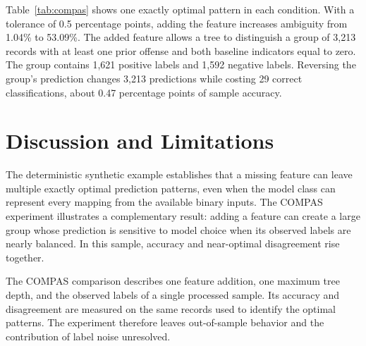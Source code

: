\documentclass{article}
\begin{document}
Table~\ref{tab:compas} shows one exactly optimal pattern in each condition. With a tolerance of 0.5 percentage points, adding the feature increases ambiguity from 1.04\% to 53.09\%. The added feature allows a tree to distinguish a group of 3,213 records with at least one prior offense and both baseline indicators equal to zero. The group contains 1,621 positive labels and 1,592 negative labels. Reversing the group's prediction changes 3,213 predictions while costing 29 correct classifications, about 0.47 percentage points of sample accuracy.

\section{Discussion and Limitations}

The deterministic synthetic example establishes that a missing feature can leave multiple exactly optimal prediction patterns, even when the model class can represent every mapping from the available binary inputs. The COMPAS experiment illustrates a complementary result: adding a feature can create a large group whose prediction is sensitive to model choice when its observed labels are nearly balanced. In this sample, accuracy and near-optimal disagreement rise together.

The COMPAS comparison describes one feature addition, one maximum tree depth, and the observed labels of a single processed sample. Its accuracy and disagreement are measured on the same records used to identify the optimal patterns. The experiment therefore leaves out-of-sample behavior and the contribution of label noise unresolved.



\end{document}
